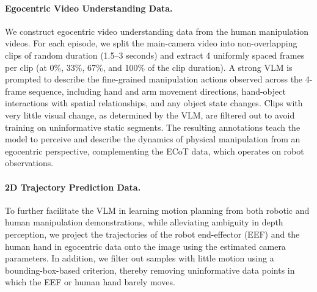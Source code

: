 
\paragraph{Egocentric Video Understanding Data.}
We construct egocentric video understanding data from the human manipulation videos. For each episode, we split the main-camera video into non-overlapping clips of random duration (1.5--3 seconds) and extract 4 uniformly spaced frames per clip (at 0\%, 33\%, 67\%, and 100\% of the clip duration). A strong VLM is prompted to describe the fine-grained manipulation actions observed across the 4-frame sequence, including hand and arm movement directions, hand-object interactions with spatial relationships, and any object state changes. Clips with very little visual change, as determined by the VLM, are filtered out to avoid training on uninformative static segments. The resulting annotations teach the model to perceive and describe the dynamics of physical manipulation from an egocentric perspective, complementing the ECoT data, which operates on robot observations.

\paragraph{2D Trajectory Prediction Data.}
To further facilitate the VLM in learning motion planning from both robotic and human manipulation demonstrations, while alleviating ambiguity in depth perception, we project the trajectories of the robot end-effector (EEF) and the human hand in egocentric data onto the image using the estimated camera parameters. In addition, we filter out samples with little motion using a bounding-box-based criterion, thereby removing uninformative data points in which the EEF or human hand barely moves.



